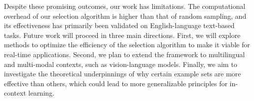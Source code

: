 \documentclass{article}
\begin{document}
Despite these promising outcomes, our work has limitations. The computational overhead of our selection algorithm is higher than that of random sampling, and its effectiveness has primarily been validated on English-language text-based tasks. Future work will proceed in three main directions. First, we will explore methods to optimize the efficiency of the selection algorithm to make it viable for real-time applications. Second, we plan to extend the framework to multilingual and multi-modal contexts, such as vision-language models. Finally, we aim to investigate the theoretical underpinnings of why certain example sets are more effective than others, which could lead to more generalizable principles for in-context learning.
\end{document}

